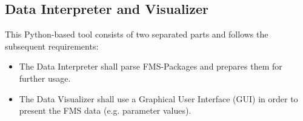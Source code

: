 \subsection{Data Interpreter and Visualizer}
This Python-based tool consists of two separated parts and follows the subsequent requirements:

\begin{itemize}
		\item The Data Interpreter shall parse FMS-Packages and prepares them for further usage.
		\item The Data Visualizer shall use a Graphical User Interface (GUI) in order to present the FMS data (e.g. parameter values).
\end{itemize}